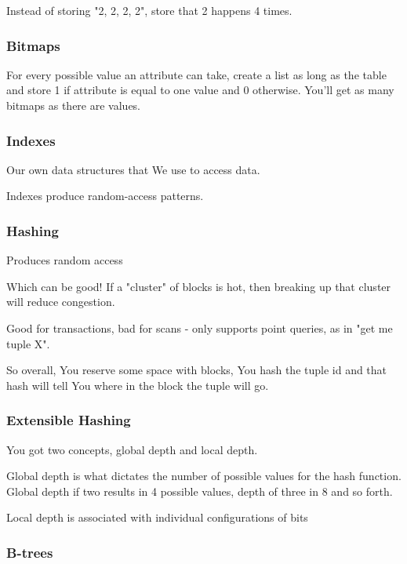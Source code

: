 \documentclass{article}
\begin{document}
				Instead of storing "2, 2, 2, 2", store that 2 happens 4 times.
				
			\subsubsection{Bitmaps}
			
				For every possible value an attribute can take, create a list as long as the table and store 1 if attribute is equal to one value and 0 otherwise. You'll get as many bitmaps as there are values.
				
			\subsubsection{Indexes}
			
				Our own data structures that We use to access data.
				
				Indexes produce random-access patterns.
				
			\subsubsection{Hashing}
			
				Produces random access
				
				Which can be good! If a "cluster" of blocks is hot, then breaking up that cluster will reduce congestion.
				
				Good for transactions, bad for scans - only supports point queries, as in "get me tuple X".
				
				So overall, You reserve some space with blocks, You hash the tuple id and that hash will tell You where in the block the tuple will go.
				
			\subsubsection{Extensible Hashing}
			
				You got two concepts, global depth and local depth.
				
				Global depth is what dictates the number of possible values for the hash function. Global depth if two results in 4 possible values, depth of three in 8 and so forth.
				
				Local depth is associated with individual configurations of bits
				
			\subsubsection{B-trees}
			
\end{document}
